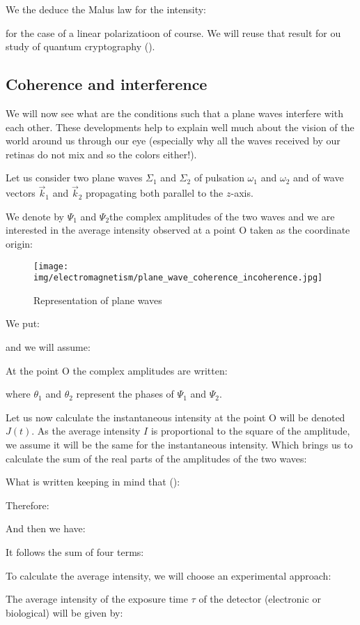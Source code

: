 	We the deduce the Malus law for the intensity:
	
	for the case of a linear polarizatioon of course. We will reuse that result for ou study of quantum cryptography ().
	
	
	\subsection{Coherence and interference}
	We will now see what are the conditions such that a plane waves interfere with each other. These developments help to explain  well much about the vision of the world around us through our eye (especially why all the waves received by our retinas do not mix and so the colors either!).

	Let us consider two plane waves $\Sigma_1$ and $\Sigma_2$ of pulsation $\omega_1$ and $\omega_2$ and of wave vectors $\vec{k}_1$ and $\vec{k}_2$ propagating both parallel to the $z$-axis.

	We denote by $\Psi_1$ and $\Psi_2$the complex amplitudes of the two waves and we are interested in the average intensity observed at a point O taken as the coordinate origin:
	\begin{figure}[H]
		\centering
		\texttt{[image: img/electromagnetism/plane\_wave\_coherence\_incoherence.jpg]}
		\caption{Representation of plane waves}
	\end{figure}
	We put:
	
	and we will assume:
	
	At the point O the complex amplitudes are written:
	
	where $\theta_1$ and $\theta_2$ represent the phases of $\Psi_1$ and $\Psi_2$.
	
	Let us now calculate the instantaneous intensity at the point O will be denoted $J(t)$. As the average intensity $I$ is proportional to the square of the amplitude, we assume it will be the same for the instantaneous intensity. Which brings us to calculate the sum of the real parts of the amplitudes of the two waves:
	
	What is written keeping in mind that ():
	
	Therefore:
	
	And then we have:
	
	It follows the sum of four terms:
	
	To calculate the average intensity, we will choose an experimental approach:

	The average intensity of the exposure time $\tau$ of the detector (electronic or biological) will be given by:
	
